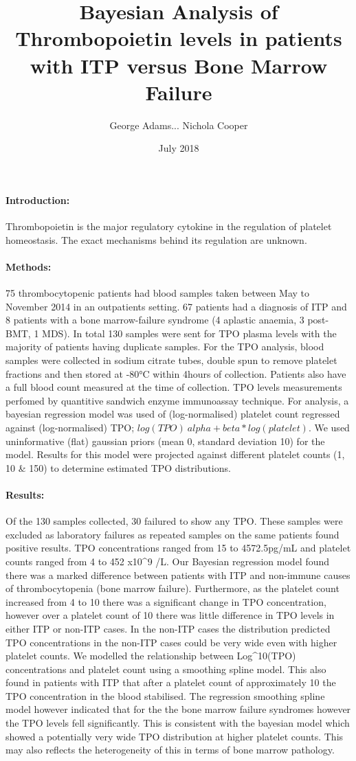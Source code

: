 \documentclass[11pt]{article}
\title{Bayesian Analysis of Thrombopoietin levels in patients with ITP versus Bone Marrow Failure}
\author{George Adams... Nichola Cooper}
\date{July 2018}
\begin{document}
\maketitle

\paragraph{Introduction:} Thrombopoietin is the major regulatory cytokine in the regulation of platelet homeostasis. The exact mechanisms behind its regulation are unknown. 
\paragraph{Methods:} 75 thrombocytopenic patients had blood samples taken between May to November 2014 in an outpatients setting. 67 patients had a diagnosis of ITP and 8 patients with a bone marrow-failure syndrome (4 aplastic anaemia, 3 post- BMT, 1 MDS). In total 130 samples were sent for TPO plasma levels with the majority of patients having duplicate samples. For the TPO analysis, blood samples were collected in sodium citrate tubes, double spun to remove platelet fractions and then stored at -80°C within 4hours of collection. Patients also have a full blood count measured at the time of collection. TPO levels measurements perfomed by quantitive sandwich enzyme immunoassay technique. For analysis, a bayesian regression model was used of (log-normalised) platelet count regressed against (log-normalised) TPO; $log(TPO) ~ alpha + beta*log(platelet)$. We used uninformative (flat) gaussian priors (mean 0, standard deviation 10) for the model. Results for this model were projected against different platelet counts (1, 10 & 150) to determine estimated TPO distributions.
\paragraph{Results:} Of the 130 samples collected, 30 failured to show any TPO. These samples were excluded as laboratory failures as repeated samples on the same patients found positive results. TPO concentrations ranged from 15 to 4572.5pg/mL and platelet counts ranged from 4 to 452 x10^9 /L. Our Bayesian regression model found there was a marked difference between patients with ITP and non-immune causes of thrombocytopenia (bone marrow failure). Furthermore, as the platelet count increased from 4 to 10 there was a significant change in TPO concentration, however over a platelet count of 10 there was little difference in TPO levels in either ITP or non-ITP cases. In the non-ITP cases the distribution predicted TPO concentrations in the non-ITP cases could be very wide even with higher platelet counts. We modelled the relationship between Log^10(TPO) concentrations and platelet count using a smoothing spline model. This also found in patients with ITP that after a platelet count of approximately 10 the TPO concentration in the blood stabilised. The regression smoothing spline model however indicated that for the the bone marrow failure syndromes however the TPO levels fell significantly. This is consistent with the bayesian model which showed a potentially very wide TPO distribution at higher platelet counts. This may also reflects the heterogeneity of this in terms of bone marrow pathology.
\end{document}

